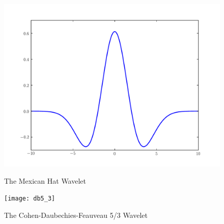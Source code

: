 \begin{figure}[H]
    \includegraphics[width=\linewidth]{mexicanHat}
    \caption{The Mexican Hat Wavelet}
\endminipage\hfill
{}
    \texttt{[image: db5\_3]}
    \caption{The Cohen-Daubechies-Feauveau 5/3 Wavelet}
\endminipage
\end{figure}